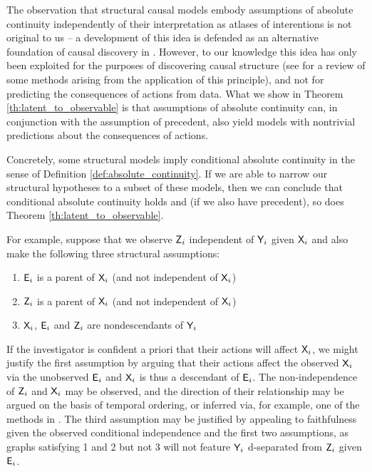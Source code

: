The observation that structural causal models embody assumptions of absolute continuity independently of their interpretation as atlases of interentions is not original to us -- a development of this idea is defended as an alternative foundation of causal discovery in \citet{lemeire_replacing_2013}. However, to our knowledge this idea has only been exploited for the purposes of discovering causal structure (see \citet{peters_elements_2017} for a review of some methods arising from the application of this principle), and not for predicting the consequences of actions from data. What we show in Theorem \ref{th:latent_to_observable} is that assumptions of absolute continuity can, in conjunction with the assumption of precedent, also yield models with nontrivial predictions about the consequences of actions.

Concretely, some structural models imply conditional absolute continuity in the sense of Definition \ref{def:absolute_continuity}. If we are able to narrow our structural hypotheses to a subset of these models, then we can conclude that conditional absolute continuity holds and (if we also have precedent), so does Theorem \ref{th:latent_to_observable}.

For example, suppose that we observe $\mathsf{Z}_i$ independent of $\mathsf{Y}_i$ given $\mathsf{X}_i$ and also make the following three structural assumptions:
\begin{enumerate}
    \item $\mathsf{E}_i$ is a parent of $\mathsf{X}_i$ (and not independent of $\mathsf{X}_i$)
    \item $\mathsf{Z}_i$ is a parent of $\mathsf{X}_i$ (and not independent of $\mathsf{X}_i$)
    \item $\mathsf{X}_i$, $\mathsf{E}_i$ and $\mathsf{Z}_i$ are nondescendants of $\mathsf{Y}_i$
\end{enumerate}

If the investigator is confident a priori that their actions will affect $\mathsf{X}_i$, we might justify the first assumption by arguing that their actions affect the observed $\mathsf{X}_i$ via the unobserved $\mathsf{E}_i$ and $\mathsf{X}_i$ is thus a descendant of $\mathsf{E}_i$. The non-independence of $\mathsf{Z}_i$ and $\mathsf{X}_i$ may be observed, and the direction of their relationship may be argued on the basis of temporal ordering, or inferred via, for example, one of the methods in \citep{peters_elements_2017}. The third assumption may be justified by appealing to faithfulness given the observed conditional independence and the first two assumptions, as graphs satisfying 1 and 2 but not 3 will not feature $\mathsf{Y}_i$ d-separated from $\mathsf{Z}_i$ given $\mathsf{E}_i$.    

